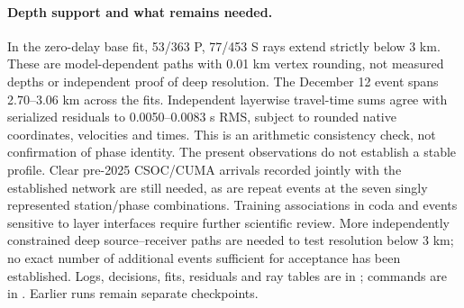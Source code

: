 \paragraph{Depth support and what remains needed.}
In the zero-delay base fit, 53/363 P, 77/453 S rays extend strictly below 3 km.
These are model-dependent paths with 0.01 km vertex rounding, not measured depths
or independent proof of deep resolution. The December 12 event spans 2.70--3.06 km across the fits.
Independent layerwise travel-time sums agree with serialized residuals to
0.0050--0.0083 s RMS, subject to rounded native coordinates, velocities and times.
This is an arithmetic consistency check, not confirmation of phase identity.
The present observations do not establish a stable profile. Clear pre-2025
CSOC/CUMA arrivals recorded jointly with the established network are still
needed, as are repeat events at the seven singly represented station/phase
combinations. Training associations in coda and events sensitive to layer
interfaces require further scientific review. More independently constrained
deep source--receiver paths are needed to test resolution below 3 km; no exact
number of additional events sufficient for acceptance has been established.
Logs, decisions, fits, residuals and ray tables are in
; commands are in
. Earlier runs remain separate checkpoints.

